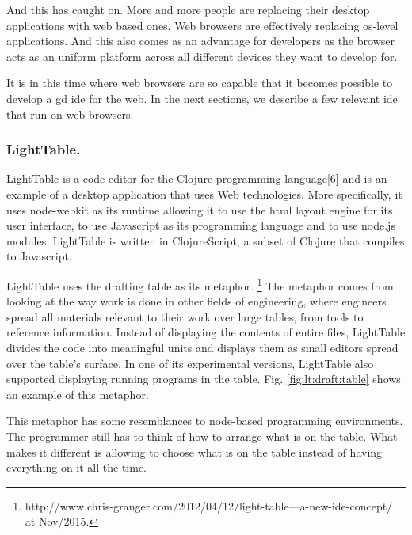 \documentclass{./llncs2e/llncs}
\begin{document}
	And this has caught on.
	More and more people are replacing their desktop applications with web based ones.
	Web browsers are effectively replacing \ac{os}-level applications.
	And this also comes as an advantage for developers as the browser acts as an uniform platform across all different devices they want to develop for.

	It is in this time where web browsers are so capable that it becomes possible to develop a \ac{gd} \ac{ide} for the web.
	In the next sections, we describe a few relevant \ac{ide} that run on web browsers.

\subsubsection{LightTable.}
	LightTable\cite{lighttable2015site} is a code editor for the Clojure programming language[6] and is an example of a desktop application that uses Web technologies.
	More specifically, it uses node-webkit as its runtime allowing it to use the html layout engine for its user interface, to use Javascript as its programming language and to use node.js\cite{tilkov2010node} modules.
	LightTable is written in ClojureScript\cite{10.1109/MIC.2011.148}, a subset of Clojure that compiles to Javascript.


	LightTable uses the drafting table as its metaphor.
	\footnote{http://www.chris-granger.com/2012/04/12/light-table---a-new-ide-concept/ at Nov/2015.}
	The metaphor comes from looking at the way work is done in other fields of engineering, where engineers spread all materials relevant to their work over large tables, from tools to reference information. 
	Instead of displaying the contents of entire files, LightTable divides the code into meaningful units and displays them as small editors spread over the table's surface. 
	In one of its experimental versions, LightTable also supported displaying running programs in the table. 
	Fig. \ref{fig:lt:draft:table} shows an example of this metaphor.

	This metaphor has some resemblances to node-based programming environments. 
	The programmer still has to think of how to arrange what is on the table.
	What makes it different is allowing to choose what is on the table instead of having everything on it all the time.
\end{document}
